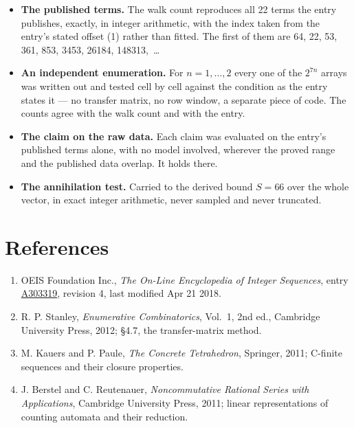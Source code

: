 \documentclass[11pt]{article}
\theoremstyle{definition}
\begin{document}
\begin{itemize}

\item {\bfseries The published terms.} The walk count reproduces all 22 terms the entry publishes, exactly, in integer arithmetic, with the index taken from the entry's stated offset (1) rather than fitted. The first of them are 64, 22, 53, 361, 853, 3453, 26184, 148313,~\dots

\item {\bfseries An independent enumeration.} For $n = 1,\dots,2$ every one of the $2^{7n}$ arrays was written out and tested cell by cell against the condition as the entry states it --- no transfer matrix, no row window, a separate piece of code. The counts agree with the walk count and with the entry.

\item {\bfseries The claim on the raw data.} Each claim was evaluated on the entry's published terms alone, with no model involved, wherever the proved range and the published data overlap. It holds there.

\item {\bfseries The annihilation test.} Carried to the derived bound $S = 66$ over the whole vector, in exact integer arithmetic, never sampled and never truncated.

\end{itemize}

\section{References}

\begin{enumerate}

\item OEIS Foundation Inc., \emph{The On-Line Encyclopedia of Integer Sequences}, entry \href{https://oeis.org/A303319}{A303319}, revision 4, last modified Apr 21 2018.

\item R. P. Stanley, \emph{Enumerative Combinatorics}, Vol.~1, 2nd ed., Cambridge University Press, 2012; \S4.7, the transfer-matrix method.

\item M. Kauers and P. Paule, \emph{The Concrete Tetrahedron}, Springer, 2011; C-finite sequences and their closure properties.

\item J. Berstel and C. Reutenauer, \emph{Noncommutative Rational Series with Applications}, Cambridge University Press, 2011; linear representations of counting automata and their reduction.

\end{enumerate}
\end{document}
